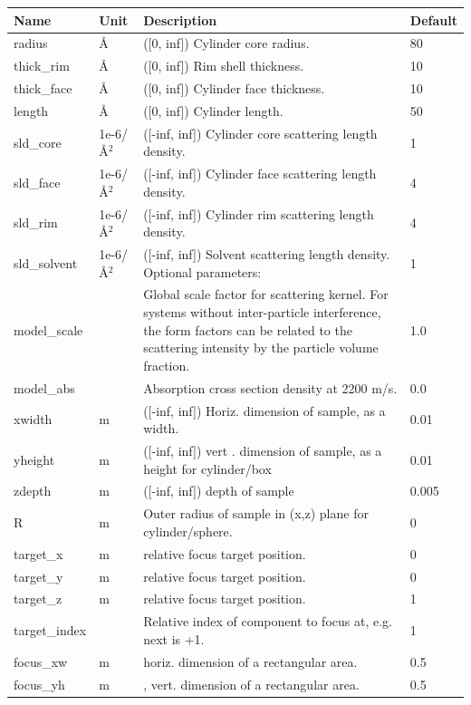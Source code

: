 \begin{longtable}{p{}p{}p{}p{}}
\toprule
\textbf{Name} & \textbf{Unit} & \textbf{Description} & \textbf{Default} \\
\midrule
\endhead
radius & \AA{} & ([0, inf]) Cylinder core radius. & 80 \\
thick\_rim & \AA{} & ([0, inf]) Rim shell thickness. & 10 \\
thick\_face & \AA{} & ([0, inf]) Cylinder face thickness. & 10 \\
length & \AA{} & ([0, inf]) Cylinder length. & 50 \\
sld\_core & 1e-6/\AA{}$^{2}$ & ([-inf, inf]) Cylinder core scattering length density. & 1 \\
sld\_face & 1e-6/\AA{}$^{2}$ & ([-inf, inf]) Cylinder face scattering length density. & 4 \\
sld\_rim & 1e-6/\AA{}$^{2}$ & ([-inf, inf]) Cylinder rim scattering length density. & 4 \\
sld\_solvent & 1e-6/\AA{}$^{2}$ & ([-inf, inf]) Solvent scattering length density. Optional parameters: & 1 \\
model\_scale &   & Global scale factor for scattering kernel. For systems without inter-particle interference, the form factors can be related to the scattering intensity by the particle volume fraction. & 1.0 \\
model\_abs &   & Absorption cross section density at 2200 m/s. & 0.0 \\
xwidth & m & ([-inf, inf]) Horiz. dimension of sample, as a width. & 0.01 \\
yheight & m & ([-inf, inf]) vert . dimension of sample, as a height for cylinder/box & 0.01 \\
zdepth & m & ([-inf, inf]) depth of sample & 0.005 \\
R & m & Outer radius of sample in (x,z) plane for cylinder/sphere. & 0 \\
target\_x & m & relative focus target position. & 0 \\
target\_y & m & relative focus target position. & 0 \\
target\_z & m & relative focus target position. & 1 \\
target\_index &   & Relative index of component to focus at, e.g. next is +1. & 1 \\
focus\_xw & m & horiz. dimension of a rectangular area. & 0.5 \\
focus\_yh & m & , vert. dimension of a rectangular area. & 0.5 \\

\end{longtable}
